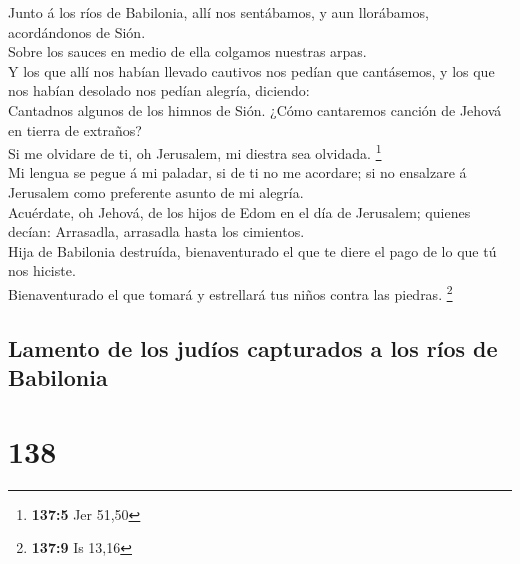  Junto á los ríos de Babilonia, allí nos sentábamos, y aun
llorábamos, acordándonos de Sión.\\
 Sobre los sauces en medio de ella colgamos nuestras
arpas.\\
 Y los que allí nos habían llevado cautivos nos pedían que
cantásemos, y los que nos habían desolado nos pedían alegría,
diciendo:\\
 Cantadnos algunos de los himnos de Sión. ¿Cómo cantaremos
canción de Jehová en tierra de extraños?\\
 Si me olvidare de ti, oh Jerusalem, mi diestra sea
olvidada. \footnote{\textbf{137:5} Jer 51,50}\\
 Mi lengua se pegue á mi paladar, si de ti no me acordare;
si no ensalzare á Jerusalem como preferente asunto de mi alegría.\\
 Acuérdate, oh Jehová, de los hijos de Edom en el día de
Jerusalem; quienes decían: Arrasadla, arrasadla hasta los cimientos.\\
 Hija de Babilonia destruída, bienaventurado el que te diere
el pago de lo que tú nos hiciste.\\
 Bienaventurado el que tomará y estrellará tus niños contra
las piedras. \footnote{\textbf{137:9} Is 13,16}

\hypertarget{lamento-de-los-juduxedos-capturados-a-los-ruxedos-de-babilonia-1}{%
\subsection{Lamento de los judíos capturados a los ríos de
Babilonia}\label{lamento-de-los-juduxedos-capturados-a-los-ruxedos-de-babilonia-1}}

\hypertarget{section-137}{%
\section{138}\label{section-137}}


